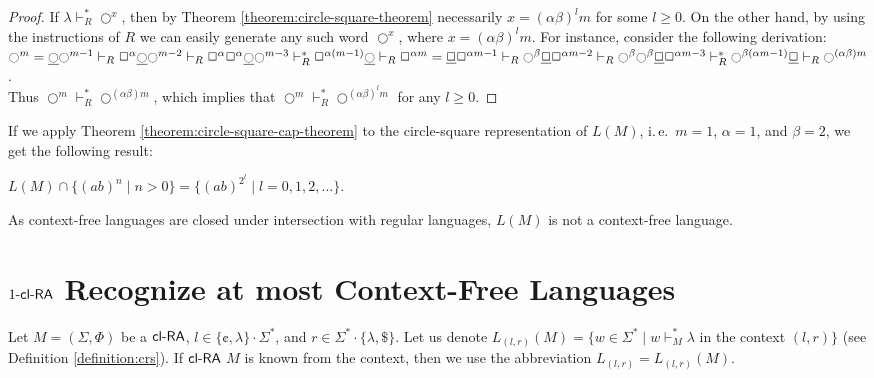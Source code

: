 \begin{proof}
If $\lambda \vdash_R^* \Circle^{x}$, then by Theorem \ref{theorem:circle-square-theorem} necessarily $x = (\alpha \beta)^l m$ for some $l \ge 0$. On the other hand, by using the instructions of $R$ we can easily generate any such word $\Circle^{x}$, where $x = (\alpha \beta)^l m$. For instance, consider the following derivation:\\
$\Circle^m = \underline{\Circle} \Circle^{m-1} \vdash_R \Square^{\alpha} \underline{\Circle} \Circle^{m-2} \vdash_R
\Square^{\alpha} \Square^{\alpha} \underline{\Circle} \Circle^{m-3} \vdash_R^*
\Square^{\alpha  (m-1)} \underline{\Circle} \vdash_R \Square^{\alpha  m} = \\
\underline{\Square} \Square^{\alpha  m - 1} \vdash_R
\Circle^{\beta} \underline{\Square} \Square^{\alpha  m - 2} \vdash_R
\Circle^{\beta} \Circle^{\beta} \underline{\Square} \Square^{\alpha  m - 3} \vdash_R^*
\Circle^{\beta (\alpha  m - 1)} \underline{\Square} \vdash_R \Circle^{(\alpha \beta)  m}$.\\
Thus $\Circle^m \vdash_R^* \Circle^{(\alpha \beta)  m}$, which implies that $\Circle^m \vdash_R^* \Circle^{(\alpha \beta)^l  m}$ for any $l \ge 0$.
\end{proof}

If we apply Theorem \ref{theorem:circle-square-cap-theorem} to the circle-square representation of $L(M)$, i.\,e.\ $m = 1$, $\alpha = 1$, and $\beta = 2$, we get the following result:

\begin{theorem}\label{theorem:4clRA}
$L(M) \cap \{(ab)^n \mid n > 0\} = \{(ab)^{2^l} \mid l = 0, 1, 2, \ldots\}$.
\end{theorem}

As context-free languages are closed under intersection with regular languages, $L(M)$ is not a context-free language.

\section[\texorpdfstring{$\kclRA[1]$ Recognize at most Context-Free Languages}%
                        {1-cl-RA Recognize at most CFL}]%
                        {$\kclRA[1]$ Recognize at most Context-Free Languages}%
\label{1clRA}
\index{$\kclRA[1]$}

Let $M = (\Sigma, \Phi)$ be a $\textup{\sf cl-RA\/}$, $l \in \{ \cent, \lambda \} \cdot \Sigma^*$, and $r \in \Sigma^* \cdot \{ \lambda, \$ \}$. Let us denote $L_{(l,r)}(M) = \{w \in \Sigma^* \mid w \vdash_M^* \lambda$ in the context $(l,r) \}$ (see Definition \ref{definition:crs}). If $\textup{\sf cl-RA\/}$ $M$ is known from the context, then we use the abbreviation $L_{(l,r)} = L_{(l,r)}(M)$.

